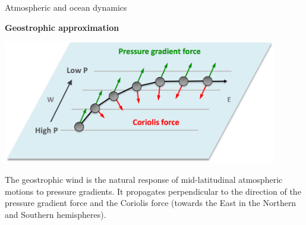\documentclass[aspectratio=169,xcolor=dvipsnames]{beamer}
\begin{document}
\begin{frame}[t]{Atmospheric and ocean dynamics}

\vspace{-1.0em}

\begin{center}
\textbf{{\large
Geostrophic approximation
}}
\end{center}

\small 
\center 

\begin{minipage}{0.6\textwidth}
\includegraphics[width=0.9\textwidth]{figs/Fig-geostrophic-balance-ajr.png}
\end{minipage}

\vspace{1em}

\begin{minipage}{0.8\textwidth}
\begin{flushleft}
The geostrophic wind is the natural response of mid-latitudinal atmospheric motions to pressure gradients. It propagates perpendicular to the direction of the pressure gradient force and the Coriolis force (towards the East in the Northern and Southern hemispheres).
\end{flushleft}
\end{minipage}

\end{frame}
\end{document}
